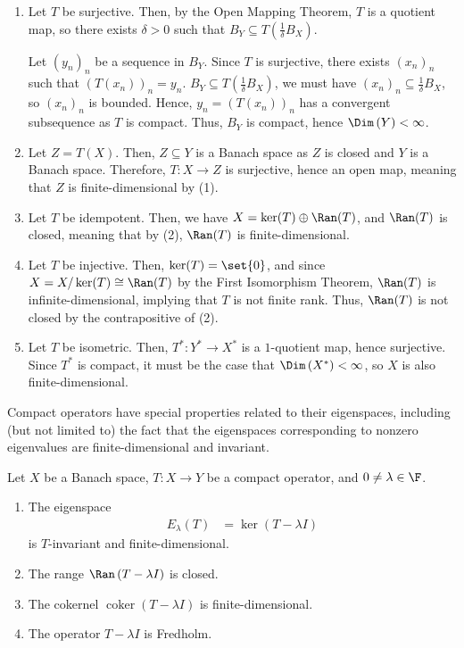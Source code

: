 \documentclass[10pt]{mypackage}
\begin{document}
\begin{solution}\hfill
  \begin{enumerate}[(1)]
    \item Let $T$ be surjective. Then, by the Open Mapping Theorem, $T$ is a quotient map, so there exists $\delta > 0$ such that $B_{Y}\subseteq T\left(\frac{1}{\delta}B_X\right)$.\newline

      Let $\left(y_n\right)_n$ be a sequence in $B_{Y}$. Since $T$ is surjective, there exists $\left(x_n\right)_n$ such that $\left(T\left(x_n\right)\right)_n = y_n$. $B_{Y}\subseteq T\left(\frac{1}{\delta}B_X\right)$, we must have $\left(x_n\right)_n\subseteq \frac{1}{\delta}B_{X}$, so $\left(x_n\right)_n$ is bounded. Hence, $y_{n} = \left(T\left(x_n\right)\right)_n$ has a convergent subsequence as $T$ is compact. Thus, $B_{Y}$ is compact, hence $\Dim\left(Y\right) < \infty$.
    \item Let $Z = T(X)$. Then, $Z\subseteq Y$ is a Banach space as $Z$ is closed and $Y$ is a Banach space. Therefore, $T: X\rightarrow Z$ is surjective, hence an open map, meaning that $Z$ is finite-dimensional by (1).
    \item Let $T$ be idempotent. Then, we have $X = \ker(T)\oplus \Ran(T)$, and $\Ran(T)$ is closed, meaning that by (2), $\Ran(T)$ is finite-dimensional.
    \item Let $T$ be injective. Then, $\ker(T) = \set{0}$, and since $X = X/\ker(T) \cong \Ran(T)$ by the First Isomorphism Theorem, $\Ran(T)$ is infinite-dimensional, implying that $T$ is not finite rank. Thus, $\Ran(T)$ is not closed by the contrapositive of (2).
    \item Let $T$ be isometric. Then, $T^{\ast}: Y^{\ast}\rightarrow X^{\ast}$ is a $1$-quotient map, hence surjective. Since $T^{\ast}$ is compact, it must be the case that $\Dim\left(X^{\ast}\right) < \infty$, so $X$ is also finite-dimensional.
  \end{enumerate}
\end{solution}
Compact operators have special properties related to their eigenspaces, including (but not limited to) the fact that the eigenspaces corresponding to nonzero eigenvalues are finite-dimensional and invariant.
\begin{proposition}
  Let $X$ be a Banach space, $T:X\rightarrow Y$ be a compact operator, and $0\neq \lambda\in \F$.
  \begin{enumerate}[(1)]
    \item The eigenspace
      \begin{align*}
        E_{\lambda}\left(T\right) &= \ker\left(T-\lambda I\right)
      \end{align*}
      is $T$-invariant and finite-dimensional.
    \item The range $\Ran\left(T-\lambda I\right)$ is closed.
    \item The cokernel $\operatorname{coker}\left(T - \lambda I\right)$ is finite-dimensional.
    \item The operator $T - \lambda I$ is Fredholm.
  \end{enumerate}
\end{proposition}
\end{document}
